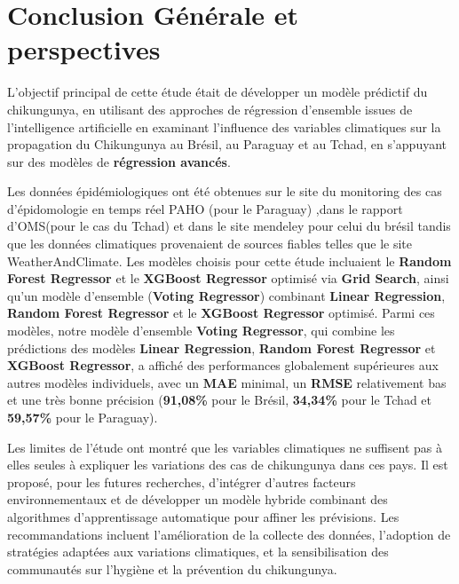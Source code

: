 \chapter*{Conclusion Générale et perspectives}

L'objectif principal de cette étude était de développer un modèle prédictif du chikungunya, en utilisant des approches de régression d'ensemble issues de l'intelligence artificielle en examinant l'influence des variables climatiques sur la propagation du Chikungunya au Brésil, au Paraguay et au Tchad, en s'appuyant sur des modèles de \textbf{régression avancés}. 

Les données épidémiologiques ont été obtenues sur le site du monitoring des cas d'épidomologie en temps réel PAHO (pour le Paraguay) ,dans le rapport d'OMS(pour le cas du Tchad) et dans le site mendeley pour celui du brésil tandis que les données climatiques provenaient de sources fiables telles que le site WeatherAndClimate.  Les modèles choisis pour cette étude incluaient le \textbf{Random Forest Regressor} et le \textbf{XGBoost Regressor} optimisé via \textbf{Grid Search}, ainsi qu'un modèle d'ensemble (\textbf{Voting Regressor}) combinant \textbf{Linear Regression}, \textbf{Random Forest Regressor} et le \textbf{XGBoost Regressor} optimisé. Parmi ces modèles, notre modèle d'ensemble \textbf{Voting Regressor}, qui combine les prédictions des modèles \textbf{Linear Regression}, \textbf{Random Forest Regressor} et \textbf{XGBoost Regressor}, a affiché des performances globalement supérieures aux autres modèles individuels, avec un \textbf{MAE} minimal, un \textbf{RMSE} relativement bas et une très bonne précision (\textbf{91,08\%} pour le Brésil, \textbf{34,34\%} pour le Tchad et \textbf{59,57\%} pour le Paraguay).

Les limites de l’étude ont montré que les variables climatiques ne suffisent pas à elles seules à expliquer les variations des cas de chikungunya dans ces pays. Il est proposé, pour les futures
recherches, d’intégrer d’autres facteurs environnementaux et de développer un modèle hybride combinant des algorithmes d’apprentissage automatique pour affiner les prévisions. Les recommandations incluent l’amélioration de la collecte des données, l’adoption de stratégies adaptées aux variations climatiques, et la sensibilisation des communautés sur l’hygiène et la prévention
du chikungunya.







